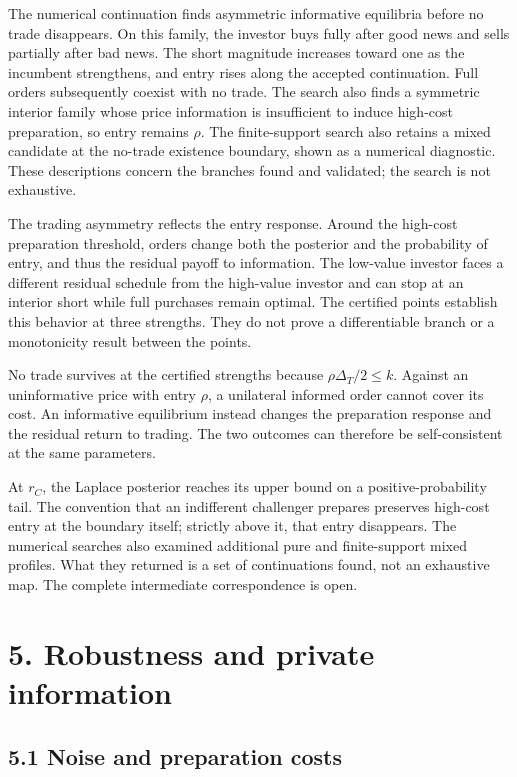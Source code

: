 \documentclass[
  12pt,
]{article}
\begin{document}
The numerical continuation finds asymmetric informative equilibria
before no trade disappears. On this family, the investor buys fully
after good news and sells partially after bad news. The short magnitude
increases toward one as the incumbent strengthens, and entry rises along
the accepted continuation. Full orders subsequently coexist with no
trade. The search also finds a symmetric interior family whose price
information is insufficient to induce high-cost preparation, so entry
remains \(\rho\). The finite-support search also retains a mixed
candidate at the no-trade existence boundary, shown as a numerical
diagnostic. These descriptions concern the branches found and validated;
the search is not exhaustive.

The trading asymmetry reflects the entry response. Around the high-cost
preparation threshold, orders change both the posterior and the
probability of entry, and thus the residual payoff to information. The
low-value investor faces a different residual schedule from the
high-value investor and can stop at an interior short while full
purchases remain optimal. The certified points establish this behavior
at three strengths. They do not prove a differentiable branch or a
monotonicity result between the points.

No trade survives at the certified strengths because
\(\rho\Delta_T/2\le k\). Against an uninformative price with entry
\(\rho\), a unilateral informed order cannot cover its cost. An
informative equilibrium instead changes the preparation response and the
residual return to trading. The two outcomes can therefore be
self-consistent at the same parameters.

At \(r_C\), the Laplace posterior reaches its upper bound on a
positive-probability tail. The convention that an indifferent challenger
prepares preserves high-cost entry at the boundary itself; strictly
above it, that entry disappears. The numerical searches also examined
additional pure and finite-support mixed profiles. What they returned is
a set of continuations found, not an exhaustive map. The complete
intermediate correspondence is open.

\section{5. Robustness and private information}\label{sec-extensions}

\subsection{5.1 Noise and preparation
costs}\label{sec-noise-and-preparation-costs}
\end{document}

